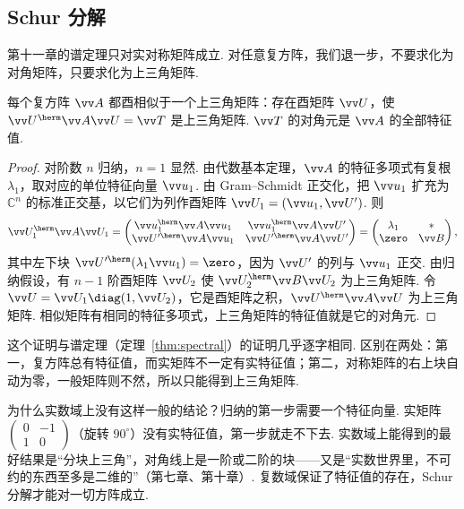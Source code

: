 	\subsection{Schur 分解}
	
	第十一章的谱定理只对实对称矩阵成立. 对任意复方阵，我们退一步，不要求化为对角矩阵，只要求化为上三角矩阵.
	
	\begin{theorem}[Schur 分解]\label{thm:schur}
		每个复方阵 $\vv A$ 都酉相似于一个上三角矩阵：存在酉矩阵 $\vv U$，使 $\vv U^\herm\vv A\vv U=\vv T$ 是上三角矩阵. $\vv T$ 的对角元是 $\vv A$ 的全部特征值.
	\end{theorem}
	\begin{proof}
		对阶数 $n$ 归纳，$n=1$ 显然. 由代数基本定理，$\vv A$ 的特征多项式有复根 $\lambda_1$，取对应的单位特征向量 $\vv u_1$. 由 Gram–Schmidt 正交化，把 $\vv u_1$ 扩充为 $\mathbb{C}^n$ 的标准正交基，以它们为列作酉矩阵 $\vv U_1=(\vv u_1,\vv U')$. 则
		\[\vv U_1^\herm\vv A\vv U_1=\begin{pmatrix}\vv u_1^\herm\vv A\vv u_1&\vv u_1^\herm\vv A\vv U'\\\vv U'^\herm\vv A\vv u_1&\vv U'^\herm\vv A\vv U'\end{pmatrix}=\begin{pmatrix}\lambda_1&*\\\zero&\vv B\end{pmatrix},\]
		其中左下块 $\vv U'^\herm(\lambda_1\vv u_1)=\zero$，因为 $\vv U'$ 的列与 $\vv u_1$ 正交. 由归纳假设，有 $n-1$ 阶酉矩阵 $\vv U_2$ 使 $\vv U_2^\herm\vv B\vv U_2$ 为上三角矩阵. 令 $\vv U=\vv U_1\diag(1,\vv U_2)$，它是酉矩阵之积，$\vv U^\herm\vv A\vv U$ 为上三角矩阵. 相似矩阵有相同的特征多项式，上三角矩阵的特征值就是它的对角元.
	\end{proof}
	
	这个证明与谱定理（定理~\ref{thm:spectral}）的证明几乎逐字相同. 区别在两处：第一，复方阵总有特征值，而实矩阵不一定有实特征值；第二，对称矩阵的右上块自动为零，一般矩阵则不然，所以只能得到上三角矩阵.
	
	\begin{motivebox}
		为什么实数域上没有这样一般的结论？归纳的第一步需要一个特征向量. 实矩阵 $\begin{pmatrix}0&-1\\1&0\end{pmatrix}$（旋转 $90^\circ$）没有实特征值，第一步就走不下去. 实数域上能得到的最好结果是“分块上三角”，对角线上是一阶或二阶的块——又是“实数世界里，不可约的东西至多是二维的”（第七章、第十章）. 复数域保证了特征值的存在，Schur 分解才能对一切方阵成立.
	\end{motivebox}
	
